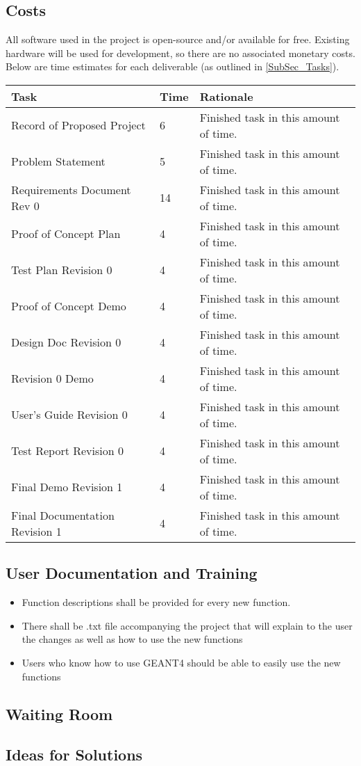 \documentclass[12pt]{article}
\begin{document}
\subsection{Costs} %
All software used in the project is open-source and/or available for free. Existing hardware will be used for development, so there are no associated monetary costs.\\
Below are time estimates for each deliverable (as outlined in \ref{SubSec_Tasks}).
\begin{table}[h]
\centering
\begin{tabular}{|p{}|p{}|p{}|}
\hline
Task & Time & Rationale\\
\hline\hline
Record of Proposed Project & 6 & Finished task in this amount of time.\\ 
Problem Statement & 5 & Finished task in this amount of time.\\ 
Requirements Document Rev 0 & 14 & Finished task in this amount of time.\\ 
Proof of Concept Plan & 4 & Finished task in this amount of time.\\ 
Test Plan Revision 0 & 4 & Finished task in this amount of time.\\ 
Proof of Concept Demo & 4 & Finished task in this amount of time.\\ 
Design Doc Revision 0 & 4 & Finished task in this amount of time.\\ 
Revision 0 Demo & 4 & Finished task in this amount of time.\\ 
User's Guide Revision 0 & 4 & Finished task in this amount of time.\\ 
Test Report Revision 0 & 4 & Finished task in this amount of time.\\ 
Final Demo Revision 1 & 4 & Finished task in this amount of time.\\ 
Final Documentation Revision 1 & 4 & Finished task in this amount of time.\\ 
\hline
\end{tabular}
\end{table}
\subsection{User Documentation and Training} %
\begin{itemize}
\item Function descriptions shall be provided for every new function. 
\item There shall be .txt file accompanying the project that will explain to the user the changes as well as how to use the new functions
\item Users who know how to use GEANT4 should be able to easily use the new functions
\end{itemize}
\subsection{Waiting Room} %
\subsection{Ideas for Solutions} %
\end{document}
